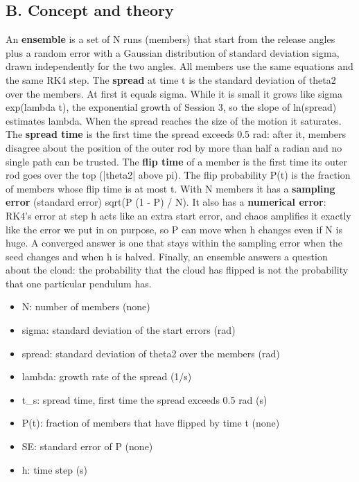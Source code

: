 \documentclass[11pt,a4paper]{article}
\begin{document}
\subsection*{B. Concept and theory}
An \textbf{ensemble} is a set of N runs (members) that start from the release angles plus a random error with a Gaussian distribution of standard deviation sigma, drawn independently for the two angles. All members use the same equations and the same RK4 step. The \textbf{spread} at time t is the standard deviation of theta2 over the members. At first it equals sigma. While it is small it grows like sigma exp(lambda t), the exponential growth of Session 3, so the slope of ln(spread) estimates lambda. When the spread reaches the size of the motion it saturates. The \textbf{spread time} is the first time the spread exceeds 0.5 rad: after it, members disagree about the position of the outer rod by more than half a radian and no single path can be trusted. The \textbf{flip time} of a member is the first time its outer rod goes over the top (|theta2| above pi). The flip probability P(t) is the fraction of members whose flip time is at most t. With N members it has a \textbf{sampling error} (standard error) sqrt(P (1 - P) / N). It also has a \textbf{numerical error}: RK4's error at step h acts like an extra start error, and chaos amplifies it exactly like the error we put in on purpose, so P can move when h changes even if N is huge. A converged answer is one that stays within the sampling error when the seed changes and when h is halved. Finally, an ensemble answers a question about the cloud: the probability that the cloud has flipped is not the probability that one particular pendulum has.

\begin{itemize}[nosep]
\item N: number of members (none)
\item sigma: standard deviation of the start errors (rad)
\item spread: standard deviation of theta2 over the members (rad)
\item lambda: growth rate of the spread (1/s)
\item t\_s: spread time, first time the spread exceeds 0.5 rad (s)
\item P(t): fraction of members that have flipped by time t (none)
\item SE: standard error of P (none)
\item h: time step (s)
\end{itemize}
\end{document}

